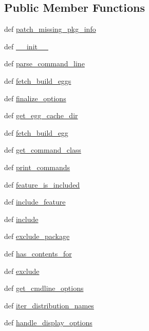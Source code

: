 \subsection*{Public Member Functions}
\begin{DoxyCompactItemize}
\item 
def \hyperlink{classsetuptools_1_1dist_1_1Distribution_a50e6c4ee2e1d9fd5ba5e64bdd3338810}{patch\+\_\+missing\+\_\+pkg\+\_\+info}
\item 
def \hyperlink{classsetuptools_1_1dist_1_1Distribution_a4532500df18efd18341c69d965d718eb}{\+\_\+\+\_\+init\+\_\+\+\_\+}
\item 
def \hyperlink{classsetuptools_1_1dist_1_1Distribution_a007bb164c66cf99c659d20866612942b}{parse\+\_\+command\+\_\+line}
\item 
def \hyperlink{classsetuptools_1_1dist_1_1Distribution_a7be95ce15107df6ab10b07db40aafbc3}{fetch\+\_\+build\+\_\+eggs}
\item 
def \hyperlink{classsetuptools_1_1dist_1_1Distribution_a8a9d52a8c30db65a5dcc30fe54066980}{finalize\+\_\+options}
\item 
def \hyperlink{classsetuptools_1_1dist_1_1Distribution_a8c07c1a0cd734c5660ae52523e45dc15}{get\+\_\+egg\+\_\+cache\+\_\+dir}
\item 
def \hyperlink{classsetuptools_1_1dist_1_1Distribution_a668c38ec1dd6878c26534e3d7b224892}{fetch\+\_\+build\+\_\+egg}
\item 
def \hyperlink{classsetuptools_1_1dist_1_1Distribution_ade9fbc684662a6a9df823846926c213b}{get\+\_\+command\+\_\+class}
\item 
def \hyperlink{classsetuptools_1_1dist_1_1Distribution_a94a69b18c92223080c4944b659b38940}{print\+\_\+commands}
\item 
def \hyperlink{classsetuptools_1_1dist_1_1Distribution_ae479520ba2d23a8dfd1853f0baeff708}{feature\+\_\+is\+\_\+included}
\item 
def \hyperlink{classsetuptools_1_1dist_1_1Distribution_a33a06c93ec4dff18585ba0cdbe4c52da}{include\+\_\+feature}
\item 
def \hyperlink{classsetuptools_1_1dist_1_1Distribution_a729085b4309a3eb7f21d5e2de6bf63c9}{include}
\item 
def \hyperlink{classsetuptools_1_1dist_1_1Distribution_ade567aa5d0cc2eb1091e3ffd65abcd61}{exclude\+\_\+package}
\item 
def \hyperlink{classsetuptools_1_1dist_1_1Distribution_a2007f04a8efc784a27bc0e33b802abd1}{has\+\_\+contents\+\_\+for}
\item 
def \hyperlink{classsetuptools_1_1dist_1_1Distribution_ae9a2920062945ad18a2036b34f7fa3f7}{exclude}
\item 
def \hyperlink{classsetuptools_1_1dist_1_1Distribution_ad096f69324df8ca2e41b9364052a8718}{get\+\_\+cmdline\+\_\+options}
\item 
def \hyperlink{classsetuptools_1_1dist_1_1Distribution_ae26ff7d7c551d649ea02ddb3ffb5f236}{iter\+\_\+distribution\+\_\+names}
\item 
def \hyperlink{classsetuptools_1_1dist_1_1Distribution_a1aea73ba5f0414e58284787e0be175e8}{handle\+\_\+display\+\_\+options}
\end{DoxyCompactItemize}
